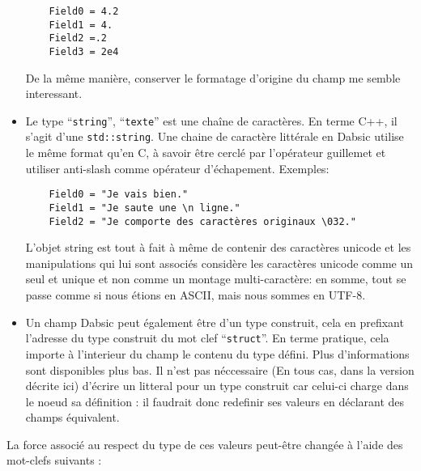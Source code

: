 \documentclass[a5paper, 12pt]{book}
\begin{document}
\begin{itemize}
\begin{verbatim}
    Field0 = 4.2
    Field1 = 4.
    Field2 =.2
    Field3 = 2e4
\end{verbatim}
	\vspace{\baselineskip}

    De la même manière, conserver le formatage d'origine du champ
    me semble interessant.
    
    \newpage
    
  \item Le type ``\verb!string!'', ``\verb!texte!'' est une chaîne de caractères. En terme C++,
    il s'agit d'une \verb!std::string!. Une chaine de caractère littérale
    en Dabsic utilise le même format qu'en C, à savoir être cerclé
    par l'opérateur guillemet et utiliser anti-slash comme opérateur
    d'échapement. Exemples:\\

\begin{verbatim}
    Field0 = "Je vais bien."
    Field1 = "Je saute une \n ligne."
    Field2 = "Je comporte des caractères originaux \032."
\end{verbatim}
	\vspace{\baselineskip}

    L'objet string est tout à fait à même de contenir des caractères
    unicode et les manipulations qui lui sont associés considère les
    caractères unicode comme un seul et unique et non comme un montage
    multi-caractère: en somme, tout se passe comme si nous étions en
    ASCII, mais nous sommes en UTF-8.
    \vspace{\baselineskip}

  \item Un champ Dabsic peut également être d'un type construit, cela
    en prefixant l'adresse du type construit du mot clef ``\verb!struct!''.
    En terme pratique, cela importe à l'interieur du champ le contenu
    du type défini. Plus d'informations sont disponibles plus bas. Il
    n'est pas néccessaire (En tous cas, dans la version décrite ici)
    d'écrire un litteral pour un type construit car celui-ci charge
    dans le noeud sa définition : il faudrait donc redefinir ses
    valeurs en déclarant des champs équivalent.
\end{itemize}

\newpage

La force associé au respect du type de ces valeurs peut-être changée
à l'aide des mot-clefs suivants :
\end{document}
